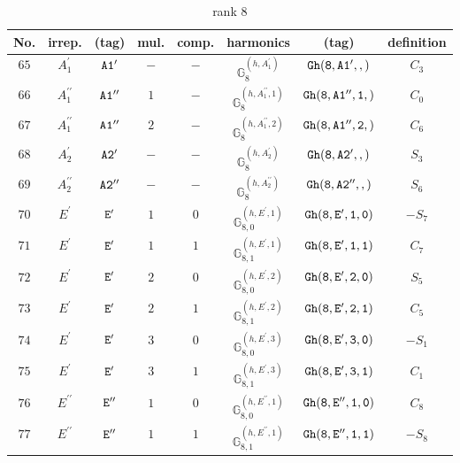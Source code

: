 \documentclass[fleqn,8pt]{jsarticle}
\begin{document}
\begin{table}[ht!]
\begin{center}
\caption{rank 8}
\renewcommand{\arraystretch}{1.3}
\begin{tabular}{cccccccc} \hline \hline
No. & irrep. & (tag) & mul. & comp. & harmonics & (tag) & definition \\ \hline
$ 65 $ & $ A_{1}^{\prime} $ & $ {\tt A1'} $ & $ - $ & $ - $ & $ \mathbb{G}_{8}^{(h,A_{1}^{\prime})} $ & $ {\tt Gh(8,A1',,)} $ & $ C_{3} $ \\
$ 66 $ & $ A_{1}^{\prime\prime} $ & $ {\tt A1''} $ & $ 1 $ & $ - $ & $ \mathbb{G}_{8}^{(h,A_{1}^{\prime\prime},1)} $ & $ {\tt Gh(8,A1'',1,)} $ & $ C_{0} $ \\
$ 67 $ & $ A_{1}^{\prime\prime} $ & $ {\tt A1''} $ & $ 2 $ & $ - $ & $ \mathbb{G}_{8}^{(h,A_{1}^{\prime\prime},2)} $ & $ {\tt Gh(8,A1'',2,)} $ & $ C_{6} $ \\
$ 68 $ & $ A_{2}^{\prime} $ & $ {\tt A2'} $ & $ - $ & $ - $ & $ \mathbb{G}_{8}^{(h,A_{2}^{\prime})} $ & $ {\tt Gh(8,A2',,)} $ & $ S_{3} $ \\
$ 69 $ & $ A_{2}^{\prime\prime} $ & $ {\tt A2''} $ & $ - $ & $ - $ & $ \mathbb{G}_{8}^{(h,A_{2}^{\prime\prime})} $ & $ {\tt Gh(8,A2'',,)} $ & $ S_{6} $ \\
$ 70 $ & $ E^{\prime} $ & $ {\tt E'} $ & $ 1 $ & $ 0 $ & $ \mathbb{G}_{8,0}^{(h,E^{\prime},1)} $ & $ {\tt Gh(8,E',1,0)} $ & $ - S_{7} $ \\
$ 71 $ & $ E^{\prime} $ & $ {\tt E'} $ & $ 1 $ & $ 1 $ & $ \mathbb{G}_{8,1}^{(h,E^{\prime},1)} $ & $ {\tt Gh(8,E',1,1)} $ & $ C_{7} $ \\
$ 72 $ & $ E^{\prime} $ & $ {\tt E'} $ & $ 2 $ & $ 0 $ & $ \mathbb{G}_{8,0}^{(h,E^{\prime},2)} $ & $ {\tt Gh(8,E',2,0)} $ & $ S_{5} $ \\
$ 73 $ & $ E^{\prime} $ & $ {\tt E'} $ & $ 2 $ & $ 1 $ & $ \mathbb{G}_{8,1}^{(h,E^{\prime},2)} $ & $ {\tt Gh(8,E',2,1)} $ & $ C_{5} $ \\
$ 74 $ & $ E^{\prime} $ & $ {\tt E'} $ & $ 3 $ & $ 0 $ & $ \mathbb{G}_{8,0}^{(h,E^{\prime},3)} $ & $ {\tt Gh(8,E',3,0)} $ & $ - S_{1} $ \\
$ 75 $ & $ E^{\prime} $ & $ {\tt E'} $ & $ 3 $ & $ 1 $ & $ \mathbb{G}_{8,1}^{(h,E^{\prime},3)} $ & $ {\tt Gh(8,E',3,1)} $ & $ C_{1} $ \\
$ 76 $ & $ E^{\prime\prime} $ & $ {\tt E''} $ & $ 1 $ & $ 0 $ & $ \mathbb{G}_{8,0}^{(h,E^{\prime\prime},1)} $ & $ {\tt Gh(8,E'',1,0)} $ & $ C_{8} $ \\
$ 77 $ & $ E^{\prime\prime} $ & $ {\tt E''} $ & $ 1 $ & $ 1 $ & $ \mathbb{G}_{8,1}^{(h,E^{\prime\prime},1)} $ & $ {\tt Gh(8,E'',1,1)} $ & $ - S_{8} $ \\

\end{tabular}
\end{center}
\end{table}
\end{document}
